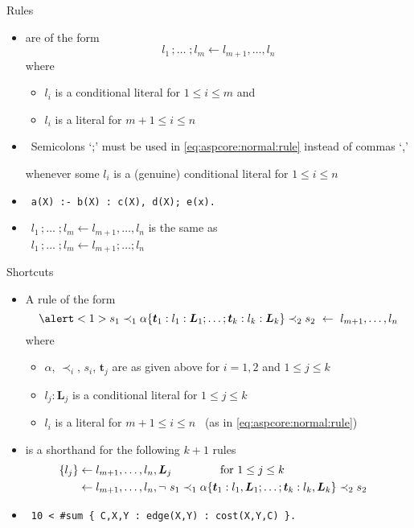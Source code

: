\begin{frame}{Rules}
  \begin{itemize}
  \item {} are of the form
    \begin{equation}
      \label{eq:aspcore:normal:rule}
       l_1\,;\dots\;;l_m\leftarrow  l_{m+1},\dots, l_n
    \end{equation}
    where
    \begin{itemize}
    \item $l_i$ is a conditional literal for $1\leq i\leq m$ and
    \item $l_i$ is a literal for $m+1\leq i\leq n$
    \end{itemize}
    \medskip
  \item<2->  \ Semicolons `;' must be used in \eqref{eq:aspcore:normal:rule} instead of commas `,'
    \par whenever some $l_i$ is a (genuine) conditional literal for $1\leq i\leq n$
  \item<3->  \  \texttt{a(X) :- b(X) : c(X), d(X)\alert{;} e(x).}
  \item<4->  \ $l_1\,;\dots\;;l_m\leftarrow  l_{m+1},\dots, l_n$ is the same as
  \\ \phantom{Note} \ $l_1\,;\dots\;;l_m\leftarrow  l_{m+1};\dots;l_n$
  \end{itemize}
\end{frame}
\begin{frame}{Shortcuts}
  \begin{itemize}
  \item<2-> A rule of the form
    \[
    \alert<1>{s_1\prec_1\alpha\{\boldsymbol{t}_1:l_1:\boldsymbol{L}_1;\dots;\boldsymbol{t}_k:l_k:\boldsymbol{L}_k\}\prec_2 s_2}
    \ \leftarrow \
     l_{m+1},\dots, l_n
    \]
    where
    \begin{itemize}
    \item $\alpha$, $\prec_i$, $s_i$, $\boldsymbol{t}_j$ are as given above for $i=1,2$ and $1\leq j\leq k$
    \item $l_j:\boldsymbol{L}_j$ is a conditional literal for $1\leq j\leq k$
    \item $l_i$ is a literal for $m+1\leq i\leq n$ \ (as in \eqref{eq:aspcore:normal:rule})
    \end{itemize}
    \medskip
  \item<3->[] is a shorthand for the following $k+1$ rules
    \begin{align*}\hspace{-10pt}
      \{ l_j\}&\leftarrow  l_{m+1},\dots, l_n,\boldsymbol{L}_j\qquad\qquad\text{ for }1\leq j\leq k\\
                &\leftarrow  l_{m+1},\dots, l_n,\neg{~s_1\prec_1\alpha\{\boldsymbol{t}_1:l_1,\boldsymbol{L}_1;\dots;\boldsymbol{t}_k:l_k,\boldsymbol{L}_k\}\prec_2 s_2}
      \end{align*}
  \item<3->  \
    \texttt{10 < \#sum \{ C,X,Y : edge(X,Y) : cost(X,Y,C) \}.}
  \end{itemize}
\end{frame}
